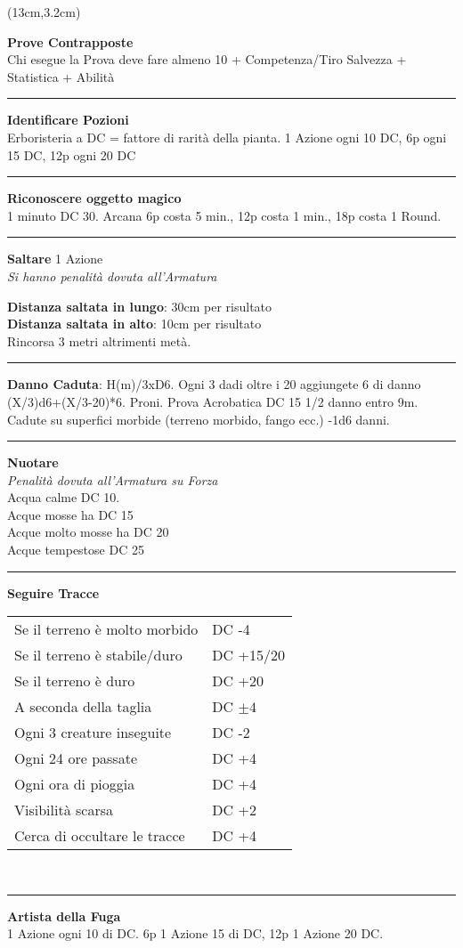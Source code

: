 \documentclass[a4paper,12 pt,openany]{book}
\newcommand{\riga}{\rule{\textwidth}{0.4pt}}
\begin{document}
\begin{textblock*}{7cm}(13cm,3.2cm) %

\textbf{Prove Contrapposte}\\
Chi esegue la Prova deve fare almeno 10 + Competenza/Tiro Salvezza + Statistica + Abilità

\riga

\textbf{Identificare  Pozioni}\\
Erboristeria a DC = fattore di rarità della pianta.  1 Azione ogni 10 DC, 6p ogni 15 DC, 12p ogni 20 DC

\riga

\textbf{Riconoscere oggetto magico}\\
1 minuto DC 30. Arcana 6p costa 5 min., 12p costa 1 min., 18p costa 1 Round.
\riga

\textbf{Saltare} 1 Azione\\
\textit{Si hanno penalità dovuta all'Armatura}

\textbf{Distanza saltata in lungo}: 30cm per risultato\\

\textbf{Distanza saltata in alto}: 10cm per risultato\\

Rincorsa 3 metri altrimenti metà.

\riga

\textbf{Danno Caduta}: H(m)/3xD6. Ogni 3 dadi oltre i 20 aggiungete 6 di danno (X/3)d6+(X/3-20)*6. Proni. Prova Acrobatica DC 15 1/2 danno entro 9m.  Cadute su superfici morbide (terreno morbido, fango ecc.) -1d6 danni.

\riga

\textbf{Nuotare}\\
\textit{Penalità dovuta all'Armatura su Forza}\\
Acqua calme DC 10.\\
Acque mosse ha DC 15\\
Acque molto mosse ha DC 20\\
Acque tempestose DC 25

\riga


\textbf{Seguire Tracce}
\begin{tabular}{ll}
Se il terreno è molto morbido& DC -4\\
Se il terreno è stabile/duro& DC +15/20\\
Se il terreno è duro& DC +20\\
A seconda della taglia& DC $\pm4$\\
Ogni 3 creature inseguite& DC -2\\
Ogni 24 ore passate& DC +4\\
Ogni ora di pioggia& DC +4\\
Visibilità scarsa& DC +2\\
Cerca di occultare le tracce& DC +4\\
\end{tabular}\\

\riga

\textbf{Artista della Fuga}\\
1 Azione ogni 10 di DC. 6p 1 Azione 15 di DC, 12p 1 Azione 20 DC.

\end{textblock*}
\end{document}

